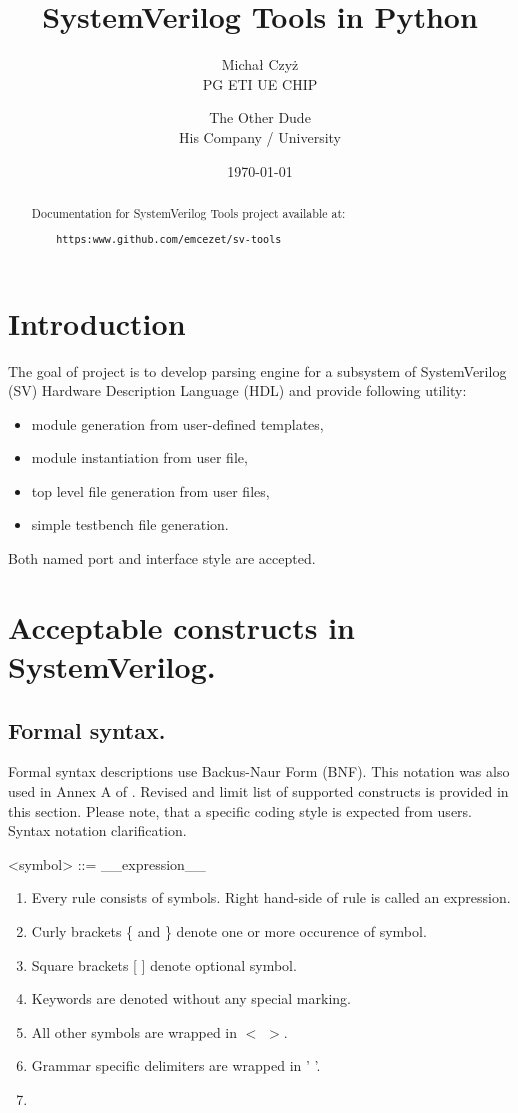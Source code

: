 \documentclass{article}
\title{SystemVerilog Tools in Python}
\author{Michał Czyż  \\
    PG ETI UE CHIP \\
    \and 
    The Other Dude \\
    His Company / University \\
    }
\date{\today}
\begin{document}
\maketitle
\tableofcontents
\newpage

\begin{abstract}
Documentation for SystemVerilog Tools project available at:
\begin{verbatim}
    https:www.github.com/emcezet/sv-tools
\end{verbatim}

\end{abstract}

\section{Introduction}
{ The goal of project is to develop parsing engine for a subsystem of SystemVerilog (SV)
Hardware Description Language (HDL) and provide following utility:
\begin{itemize}
    \item module generation from user-defined templates,
    \item module instantiation from user file,
    \item top level file generation from user files,
    \item simple testbench file generation.
\end{itemize}
Both named port and interface style are accepted. }

\section{Acceptable constructs in SystemVerilog.}

\subsection{Formal syntax.}
{ Formal syntax descriptions use Backus-Naur Form (BNF). This notation was also used in Annex A of \cite{standard}.
Revised and limit list of supported constructs is provided in this section. Please note, that a specific coding
style is expected from users. Syntax notation clarification.}

\begin{grammar}
    <symbol> ::= __expression__
\end{grammar}

\begin{enumerate}
    \item Every rule consists of symbols. Right hand-side of rule is called an expression.
    \item Curly brackets \{ and \} denote one or more occurence of symbol.
    \item Square brackets [ ] denote optional symbol.
    \item Keywords are denoted without any special marking.
    \item All other symbols are wrapped in $<$ $>$.
    \item Grammar specific delimiters are wrapped in ' '.
    \item
\end{enumerate}
\end{document}
